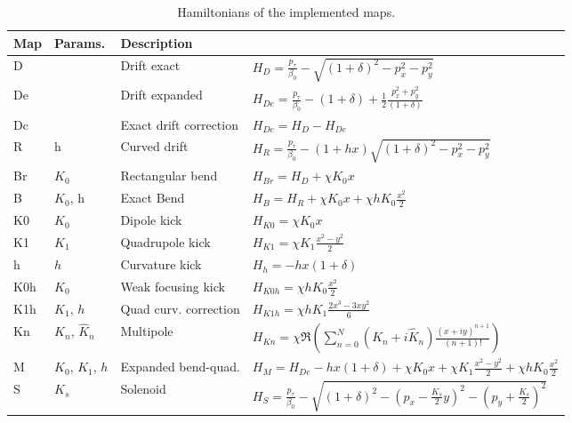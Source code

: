 \begin{table}[htb]
\centering
{\small
\begin{tabular}{llll}
\toprule
\textbf{Map} & \textbf{Params.} & \textbf{Description} \\
\midrule
D   &            & Drift exact   &
$H_D = \frac{p_\tau}{\beta_0} - \sqrt{(1 + \delta)^2 - p_x^2 - p_y^2}$ \\
De  &            & Drift expanded &
$H_{De} = \frac{p_\tau}{\beta_0} - (1 + \delta) + \frac{1}{2}\frac{p_x^2 + p_y^2}{(1 + \delta)}$\\
Dc  &            & Exact drift correction &
$H_{Dc} = H_D - H_{De}$\\
R   & h         & Curved drift&
$H_R = \frac{p_\tau}{\beta_0} - (1+h x) \sqrt{(1 + \delta)^2 - p_x^2 - p_y^2}$\\
Br  & $K_0$        & Rectangular bend &
$H_{Br} = H_D + \chi K_0 x$
\\
B   & $K_0$, h     & Exact Bend &
$H_{B} = H_R + \chi K_0 x + \chi h K_0 \frac{x^2}{2}$\\
K0  & $K_0$           & Dipole kick &
$H_{K0} = \chi K_0 x$\\
K1  & $K_1$       & Quadrupole kick &
$H_{K1} = \chi K_1\frac{x^2 - y^2}{2}$\\
h  & $h$         & Curvature kick &
$H_{h} = -h x (1 + \delta)$\\
K0h & $K_0$          & Weak focusing kick &
$H_{K0h} = \chi h K_0  \frac{x^2}{2}$\\
K1h & $K_1$, $h$      & Quad curv. correction &
$H_{K1h} = \chi h K_1 \frac{2 x^3 - 3 xy^2}{6}$\\
Kn  & $K_n$, $\hat{K}_n$     & Multipole &
$H_{Kn} = \chi \Re\left( \sum_{n=0}^N (K_n+i{\hat K}_n)\frac{(x+iy)^{n+1}}{(n+1)!}\right)$
\\
M   & $K_0$, $K_1$, $h$ & Expanded bend-quad. &
$H_{M} =  H_{De} - h x (1 + \delta) + \chi K_0 x + \chi K_1\frac{x^2 - y^2}{2} + \chi h K_0 \frac{x^2}{2}$\\
S   & $K_s$          & Solenoid &
$H_{S} = \frac{p_\tau}{\beta_0} - \sqrt{(1 + \delta)^2 - \left(p_x-\frac{K_s}{2} y\right)^2 - \left(p_y+\frac{K_s}{2}\right)^2}$
\\
\bottomrule
\end{tabular}
}
\caption{Hamiltonians of the implemented maps.
        \label{tab:maps}}
\end{table}


